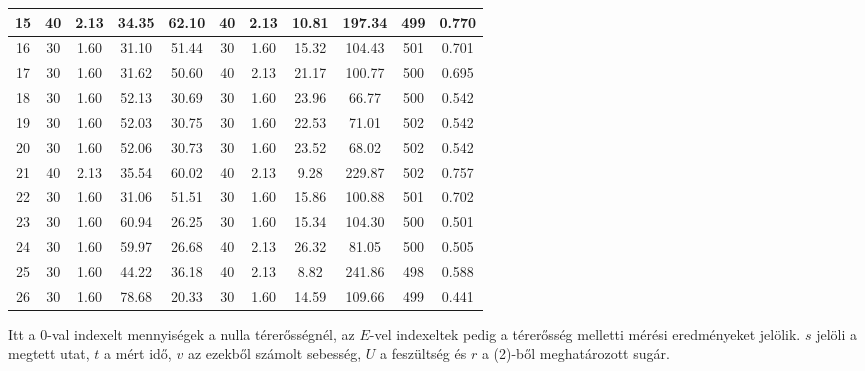 \documentclass[a4paper]{article}
\begin{document}
\begin{table}[h!]
\begin{tabular}{|c|c|c|c|c|c|c|c|c|c|c|}
		15 & 40 & 2.13 & 34.35 & 62.10 & 40 & 2.13 & 10.81 & 197.34 & 499 & 0.770 \\ \hline
		16 & 30 & 1.60 & 31.10 & 51.44 & 30 & 1.60 & 15.32 & 104.43 & 501 & 0.701 \\ \hline
		17 & 30 & 1.60 & 31.62 & 50.60 & 40 & 2.13 & 21.17 & 100.77 & 500 & 0.695 \\ \hline
		18 & 30 & 1.60 & 52.13 & 30.69 & 30 & 1.60 & 23.96 & 66.77 & 500 & 0.542 \\ \hline
		19 & 30 & 1.60 & 52.03 & 30.75 & 30 & 1.60 & 22.53 & 71.01 & 502 & 0.542 \\ \hline
		20 & 30 & 1.60 & 52.06 & 30.73 & 30 & 1.60 & 23.52 & 68.02 & 502 & 0.542 \\ \hline
		21 & 40 & 2.13 & 35.54 & 60.02 & 40 & 2.13 & 9.28 & 229.87 & 502 & 0.757 \\ \hline
		22 & 30 & 1.60 & 31.06 & 51.51 & 30 & 1.60 & 15.86 & 100.88 & 501 & 0.702 \\ \hline
		23 & 30 & 1.60 & 60.94 & 26.25 & 30 & 1.60 & 15.34 & 104.30 & 500 & 0.501 \\ \hline
		24 & 30 & 1.60 & 59.97 & 26.68 & 40 & 2.13 & 26.32 & 81.05 & 500 & 0.505 \\ \hline
		25 & 30 & 1.60 & 44.22 & 36.18 & 40 & 2.13 & 8.82 & 241.86 & 498 & 0.588 \\ \hline
		26 & 30 & 1.60 & 78.68 & 20.33 & 30 & 1.60 & 14.59 & 109.66 & 499 & 0.441 \\ \hline
	\end{tabular}
		
\end{table}

Itt a $0$-val indexelt mennyiségek a nulla térerősségnél, az $E$-vel indexeltek pedig a térerősség melletti mérési eredményeket jelölik. $s$ jelöli a megtett utat, $t$ a mért idő, $v$ az ezekből számolt sebesség, $U$ a feszültség és $r$ a (2)-ből meghatározott sugár.
\end{document}
